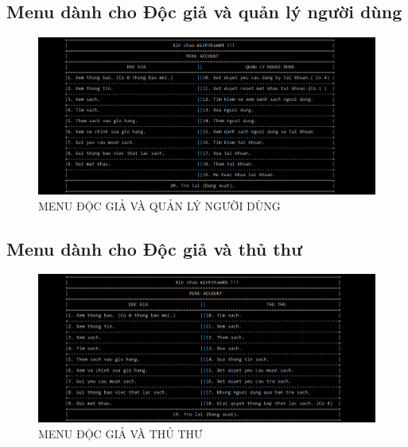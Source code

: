 \documentclass[16pt,a4paper,oneside]{article}
\begin{document}
\subsection{Menu dành cho Độc giả và quản lý người dùng}
\begin{figure}[htp]
	\begin{center}
		\includegraphics[width=18cm]{Images/menu_docgiavaquanlynguoidung.png}
		\caption{MENU ĐỘC GIẢ VÀ QUẢN LÝ NGƯỜI DÙNG}
	\end{center}
\end{figure}

\subsection{Menu dành cho Độc giả và thủ thư}
\begin{figure}[htp]
	\begin{center}
		\includegraphics[width=18cm]{Images/menu_docgiavathuthu.png}
		\caption{MENU ĐỘC GIẢ VÀ THỦ THƯ}
	\end{center}
\end{figure}
\end{document}
